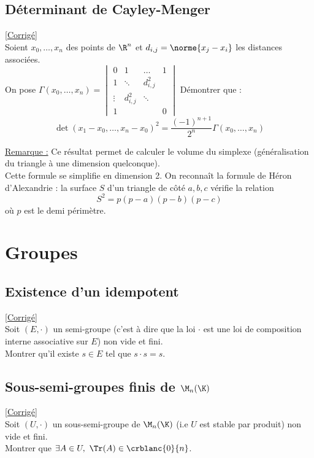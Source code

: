 \documentclass[8pt]{book}
\begin{document}
	\section{Déterminant de Cayley-Menger }
	\label{Déterminant de Cayley-Menger}
	\textcolor{blue}{\hyperref[Déterminant de Cayley-Menger corrigé]{[Corrigé]}}\\
	Soient $x_0,\dots,x_n$ des points de $\R^n$ et $d_{i,j}=\norme{x_j-x_i}$ les distances associées.
	\\On pose $\Gamma(x_0,\dots,x_n)=\begin{vmatrix}
		0&1&\dots&1\\
		1&\ddots&d_{i,j}^2&\\
		\vdots & d_{i,j}^2&\ddots &\\
		1&&&0
	\end{vmatrix}$
	Démontrer que : $$\det(x_1-x_0,\dots,x_n-x_0)^2=\frac{(-1)^{n+1}}{2^n}\Gamma(x_0,\dots,x_n)$$
	
	\underline{Remarque :} Ce résultat permet de calculer le volume du simplexe (généralisation du triangle à une dimension quelconque).
	\\Cette formule se simplifie en dimension 2. On reconnaît la formule de Héron d'Alexandrie : la surface $S$ d'un triangle de côté $a,b,c$ vérifie la relation $$S^2=p(p-a)(p-b)(p-c)$$ où $p$ est le demi périmètre.
	
\chapter{Groupes}
	\section{Existence d'un idempotent }
	\label{Existence d'un idempotent}
	\textcolor{blue}{\hyperref[Existence d'un idempotent corrigé]{[Corrigé]}}\\
	Soit $(E,\cdot)$ un semi-groupe (c'est à dire que la loi $\cdot$ est une loi de composition interne associative sur $E$) non vide et fini.\\
	Montrer qu'il existe $s\in E$ tel que $s\cdot s=s$.
	
	\section{Sous-semi-groupes finis de $\M_n(\K)$ }
	\label{Sous-semi-groupes finis de Mn(K)}
	\textcolor{blue}{\hyperref[Sous-semi-groupes finis de Mn(K) corrigé]{[Corrigé]}}\\
	Soit $(U,\cdot)$ un sous-semi-groupe de $\M_n(\K)$ (i.e $U$ est stable par produit) non vide et fini.\\
	Montrer que $\exists A\in U,\ \Tr(A)\in \crblanc{0}{n}$.
	
\end{document}

